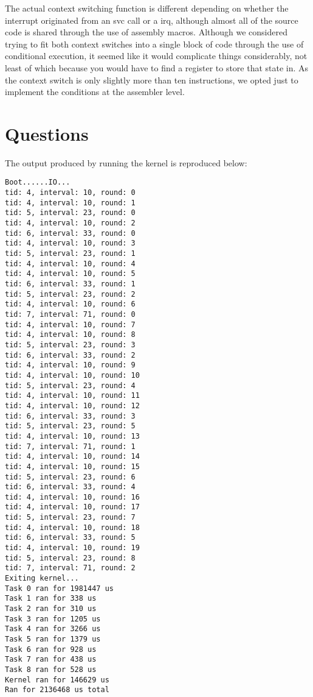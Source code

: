 \documentclass[titlepage]{article}
\begin{document}
The actual context switching function is different depending on whether the
interrupt originated from an svc call or a irq, although almost all of the
source code is shared through the use of assembly macros. Although we considered
trying to fit both context switches into a single block of code through the use
of conditional execution, it seemed like it would complicate things
considerably, not least of which because you would have to find a register to
store that state in. As the context switch is only slightly more than ten
instructions, we opted just to implement the conditions at the assembler level.


\section{Questions}

The output produced by running the kernel is reproduced below:

\begin{verbatim}
Boot......IO...
tid: 4, interval: 10, round: 0
tid: 4, interval: 10, round: 1
tid: 5, interval: 23, round: 0
tid: 4, interval: 10, round: 2
tid: 6, interval: 33, round: 0
tid: 4, interval: 10, round: 3
tid: 5, interval: 23, round: 1
tid: 4, interval: 10, round: 4
tid: 4, interval: 10, round: 5
tid: 6, interval: 33, round: 1
tid: 5, interval: 23, round: 2
tid: 4, interval: 10, round: 6
tid: 7, interval: 71, round: 0
tid: 4, interval: 10, round: 7
tid: 4, interval: 10, round: 8
tid: 5, interval: 23, round: 3
tid: 6, interval: 33, round: 2
tid: 4, interval: 10, round: 9
tid: 4, interval: 10, round: 10
tid: 5, interval: 23, round: 4
tid: 4, interval: 10, round: 11
tid: 4, interval: 10, round: 12
tid: 6, interval: 33, round: 3
tid: 5, interval: 23, round: 5
tid: 4, interval: 10, round: 13
tid: 7, interval: 71, round: 1
tid: 4, interval: 10, round: 14
tid: 4, interval: 10, round: 15
tid: 5, interval: 23, round: 6
tid: 6, interval: 33, round: 4
tid: 4, interval: 10, round: 16
tid: 4, interval: 10, round: 17
tid: 5, interval: 23, round: 7
tid: 4, interval: 10, round: 18
tid: 6, interval: 33, round: 5
tid: 4, interval: 10, round: 19
tid: 5, interval: 23, round: 8
tid: 7, interval: 71, round: 2
Exiting kernel...
Task 0 ran for 1981447 us
Task 1 ran for 338 us
Task 2 ran for 310 us
Task 3 ran for 1205 us
Task 4 ran for 3266 us
Task 5 ran for 1379 us
Task 6 ran for 928 us
Task 7 ran for 438 us
Task 8 ran for 528 us
Kernel ran for 146629 us
Ran for 2136468 us total
\end{verbatim}
\end{document}
